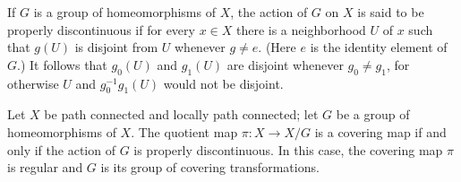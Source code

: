 \begin{definition}
	If \(G\) is a group of homeomorphisms of \(X\), the action of \(G\) on \(X\) is said to be properly discontinuous if for every \(x \in X\) there is a neighborhood \(U\) of \(x\) such that \(g( U)\) is disjoint from \(U\) whenever \(g \neq e\). (Here \(e\) is the identity element of \(G\).) It follows that \(g_{0}( U)\) and \(g_{1}( U)\) are disjoint whenever \(g_{0} \neq {g}_{1}\), for otherwise \(U\) and \(g_0^{-1}g_{1}( U)\) would not be disjoint.
\end{definition}

\begin{theorem}
\label{thm:\thetheorem}
	Let \(X\) be path connected and locally path connected; let \(G\) be a group of homeomorphisms of \(X\). The quotient map \(\pi : X \rightarrow X/G\) is a covering map if and only if the action of \(G\) is properly discontinuous. In this case, the covering map \(\pi\) is regular and \(G\) is its group of covering transformations.
\end{theorem}

